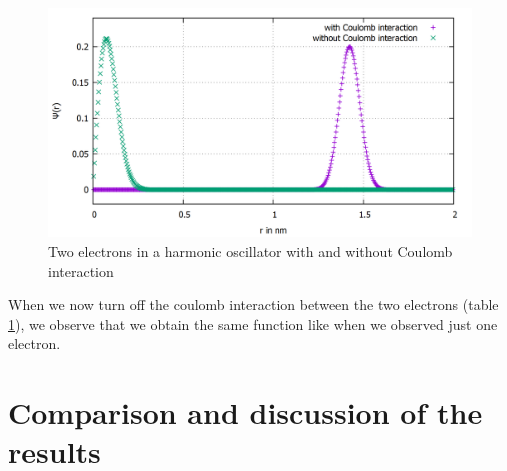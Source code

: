 \documentclass[10pt,a4paper]{article}
\begin{document}
\begin{figure}[h]
	\includegraphics[scale = 0.25]{k1_comparison_2El_n500.png}
	\centering
	\caption{Two electrons in a harmonic oscillator with and without Coulomb interaction}
	\label{plot2elrcoulomb}
\end{figure}

When we now turn off the coulomb interaction between the two electrons (table \ref{plot2elrcoulomb}), we observe that we obtain the same function like when we observed just one electron.

\section{Comparison and discussion of the results} \label{Comparison and results}
\end{document}
